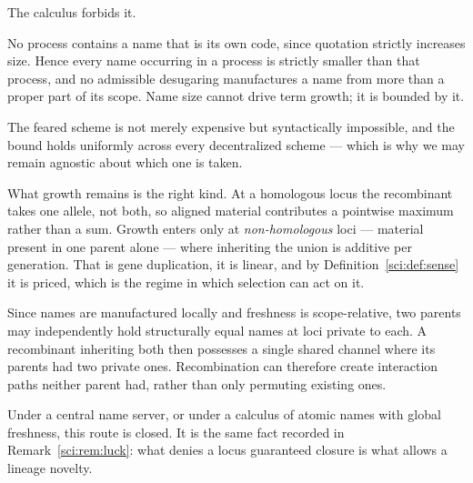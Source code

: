 The calculus forbids it.

\begin{proposition}
\label{sci:prop:namegrowth}
No process contains a name that is its own code, since quotation strictly increases size. Hence every
name occurring in a process is strictly smaller than that process, and no admissible desugaring
manufactures a name from more than a proper part of its scope. Name size cannot drive term growth; it
is bounded by it.
\end{proposition}

The feared scheme is not merely expensive but syntactically impossible, and the bound holds uniformly
across every decentralized scheme --- which is why we may remain agnostic about which one is taken.

What growth remains is the right kind. At a homologous locus the recombinant takes one allele, not
both, so aligned material contributes a pointwise maximum rather than a sum. Growth enters only at
\emph{non-homologous} loci --- material present in one parent alone --- where inheriting the union is
additive per generation. That is gene duplication, it is linear, and by
Definition~\ref{sci:def:sense} it is priced, which is the regime in which selection can act on it.

\begin{proposition}
\label{sci:prop:accidental}
Since names are manufactured locally and freshness is scope-relative, two parents may independently
hold structurally equal names at loci private to each. A recombinant inheriting both then possesses a
single shared channel where its parents had two private ones. Recombination can therefore create
interaction paths neither parent had, rather than only permuting existing ones.
\end{proposition}

Under a central name server, or under a calculus of atomic names with global freshness, this route is
closed. It is the same fact recorded in Remark~\ref{sci:rem:luck}: what denies a locus guaranteed closure
is what allows a lineage novelty.

